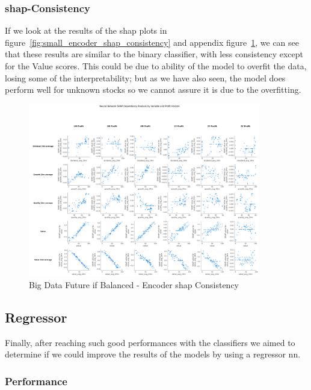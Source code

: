 \documentclass[11pt,english,a4paper,hidelinks]{book}
\begin{document}
\subsubsection{\acrshort{shap}-Consistency}

If we look at the results of the \gls{shap} plots in figure~\ref{fig:small_encoder_shap_consistency} and appendix figure~\ref{fig:big_encoder_shap_consistency}, we can see that these results are similar to the binary classifier, with less consistency except for the Value scores. This could be due to ability of the model to overfit the data, losing some of the interpretability; but as we have also seen, the model does perform well for unknown stocks so we cannot assure it is due to the overfitting.

\begin{figure}[H]
    \centering
    \includegraphics[width=0.9\textwidth]{images/code/models/neural_network/binary_classifier_nn/Big Data future - IF HARD Balanced/shap_table_analysis.png}
    \caption{Big Data Future \acrshort{if} Balanced - Encoder \gls{shap} Consistency}
    \label{fig:big_encoder_shap_consistency}
\end{figure}

\subsection{Regressor}

\noindent Finally, after reaching such good performances with the classifiers we aimed to determine if we could improve the results of the models by using a regressor \acrshort{nn}.

\subsubsection{Performance}
\end{document}
